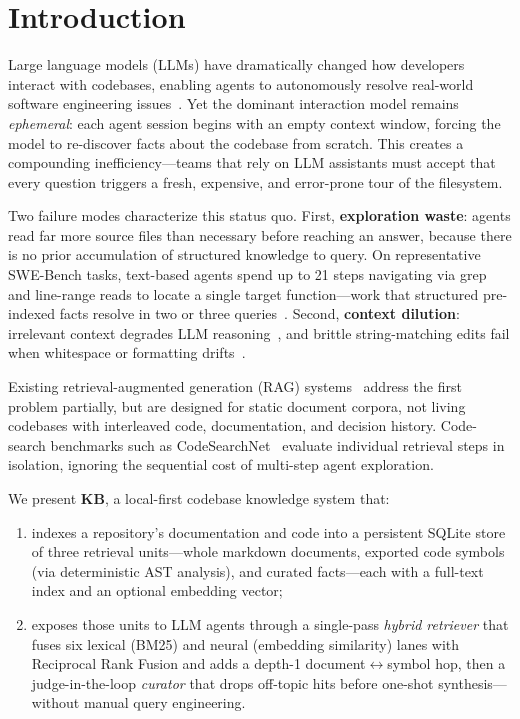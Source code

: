 \section{Introduction}
\label{sec:intro}

Large language models (LLMs) have dramatically changed how developers interact
with codebases, enabling agents to autonomously resolve real-world software
engineering issues~\cite{yang2024sweagent}.  Yet the dominant interaction model remains \emph{ephemeral}:
each agent session begins with an empty context window, forcing the model to
re-discover facts about the codebase from scratch.  This creates a compounding
inefficiency—teams that rely on LLM assistants must accept that every question
triggers a fresh, expensive, and error-prone tour of the filesystem.

Two failure modes characterize this status quo.  First, \textbf{exploration
waste}: agents read far more source files than necessary before reaching an
answer, because there is no prior accumulation of structured knowledge to query.
On representative SWE-Bench tasks, text-based agents spend up to 21 steps
navigating via grep and line-range reads to locate a single target function---work
that structured pre-indexed facts resolve in two or three
queries~\cite{kim2025codestruct}.  Second,
\textbf{context dilution}: irrelevant context degrades LLM
reasoning~\cite{shi2023distracted}, and brittle
string-matching edits fail when whitespace or formatting drifts~\cite{kim2025codestruct}.

Existing retrieval-augmented generation (RAG) systems~\cite{lewis2020rag}
address the first problem partially, but are designed for static document
corpora, not living codebases with interleaved code, documentation, and
decision history.  Code-search benchmarks such as
CodeSearchNet~\cite{husain2019codesearchnet} evaluate individual retrieval
steps in isolation, ignoring the sequential cost of multi-step agent
exploration.

We present \textbf{KB}, a local-first codebase knowledge
system that:
\begin{enumerate}
  \item[(1)] indexes a repository's documentation and code into a persistent
    SQLite store of three retrieval units---whole markdown documents, exported
    code symbols (via deterministic AST analysis), and curated facts---each with
    a full-text index and an optional embedding vector;
  \item[(2)] exposes those units to LLM agents through a single-pass
    \emph{hybrid retriever} that fuses six lexical (BM25) and neural (embedding
    similarity) lanes with Reciprocal Rank Fusion and adds a depth-1
    document$\leftrightarrow$symbol hop, then a judge-in-the-loop \emph{curator}
    that drops off-topic hits before one-shot synthesis---without manual query
    engineering.
\end{enumerate}

